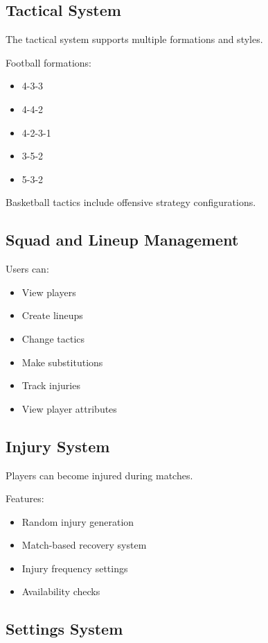 \documentclass[11pt,a4paper]{article}
\begin{document}
\subsection{Tactical System}

The tactical system supports multiple formations and styles.

Football formations:
\begin{itemize}
\item 4-3-3
\item 4-4-2
\item 4-2-3-1
\item 3-5-2
\item 5-3-2
\end{itemize}

Basketball tactics include offensive strategy configurations.

\subsection{Squad and Lineup Management}

Users can:
\begin{itemize}
\item View players
\item Create lineups
\item Change tactics
\item Make substitutions
\item Track injuries
\item View player attributes
\end{itemize}

\subsection{Injury System}

Players can become injured during matches.

Features:
\begin{itemize}
\item Random injury generation
\item Match-based recovery system
\item Injury frequency settings
\item Availability checks
\end{itemize}

\subsection{Settings System}
\end{document}

